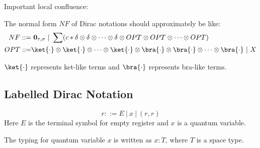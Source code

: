 \begin{example}
  Important local confluence:
  \begin{center}
  \end{center}
\end{example}

\begin{claim}
  The normal form $NF$ of Dirac notations should approximately be like:
  \begin{align*}
    NF ::=&\ \mathbf{0}_{\tau, \sigma}\ |\ \sum (c*\delta\otimes\delta\otimes \cdots \otimes \delta \otimes OPT \otimes OPT \otimes \cdots \otimes OPT) \\
    OPT ::=& \ket{\cdot} \otimes \ket{\cdot} \otimes \cdots \otimes \ket{\cdot} \otimes \bra{\cdot} \otimes \bra{\cdot} \otimes \cdots \otimes \bra{\cdot}\ |\ X
  \end{align*}
\end{claim}

$\ket{\cdot}$ represents ket-like terms and $\bra{\cdot}$ represents bra-like terms.


\clearpage


\subsection{Labelled Dirac Notation}

\begin{definition}
  $$
  r ::= E\ |\ x\ |\ (r, r)
  $$
  Here $E$ is the terminal symbol for empty register and $x$ is a quantum variable.
\end{definition}

\begin{definition}
  The typing for quantum variable $x$ is written as $x : T$, where $T$ is a space type.
\end{definition}

